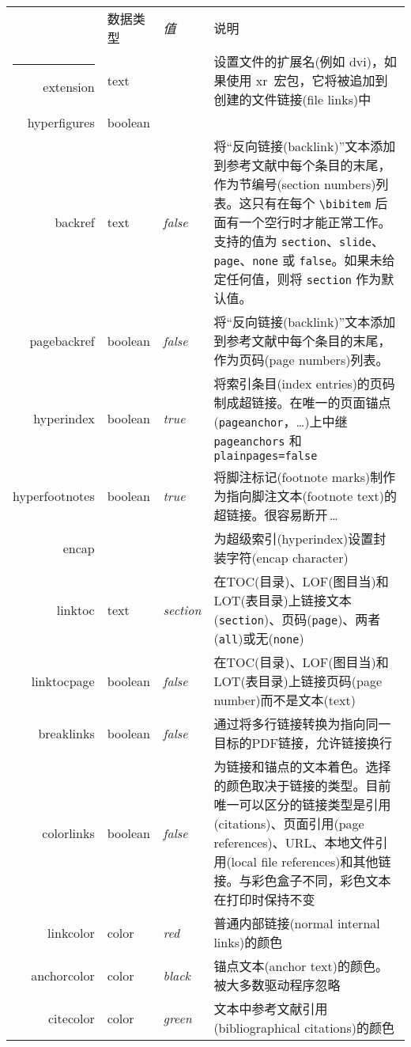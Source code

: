 \documentclass{article}
\makeatletter
\newcommand*{\xpackage}[1]{\textsf{#1}}
\newcommand{\Heiti}{\CJKfamily{Heiti}} %
\newcommand{\kaiti}{\CJKfamily{kaiti}} %
\def\hlinew#1{%
\noalign{\ifnum0=`}\fi\hrule \@height #1 \futurelet
\reserved@a\@xhline}
\makeatother
\begin{document}
\begin{longtable}{@{}>{\ttfamily}rl>{\itshape}lp{8cm}@{}}
{\Heiti 扩展选项名}&{\Heiti 数据类型}&{\Heiti 值}& {\Heiti 说明} \\ \hlinew{0.7pt}
extension      & text    &         & 设置文件的扩展名(例如 \textsf{dvi})，如果使用 \xpackage{xr}\ 宏包，它将被追加到创建的文件链接(file links)中\\
hyperfigures   & boolean &         & \\
backref        & text    & false   & 将“反向链接(backlink)”文本添加到参考文献中每个条目的末尾，作为节编号(section numbers)列表。这{\kaiti 只有}在每个 \verb|\bibitem| 后面有一个空行时才能正常工作。支持的值为 \verb|section|、\verb|slide|、\verb|page|、\verb|none| 或 \verb|false|。如果未给定任何值，则将 \verb|section| 作为默认值。\\
pagebackref    & boolean & false   & 将“反向链接(backlink)”文本添加到参考文献中每个条目的末尾，作为页码(page numbers)列表。\\
hyperindex     & boolean & true    & 将索引条目(index entries)的页码制成超链接。在唯一的页面锚点(\verb|pageanchor|，\ldots)上中继 \verb|pageanchors| 和 \verb|plainpages=false|\\
hyperfootnotes & boolean & true    & 将脚注标记(footnote marks)制作为指向脚注文本(footnote text)的超链接。很容易断开\,\ldots\\
encap          &         &         & 为超级索引(hyperindex)设置封装字符(encap character)\\
linktoc        & text    & section & 在TOC(目录)、LOF(图目当)和LOT(表目录)上链接文本(\verb|section|)、页码(\verb|page|)、两者(\verb|all|)或无(\verb|none|)\\
linktocpage    & boolean & false   & 在TOC(目录)、LOF(图目当)和LOT(表目录)上链接页码(page number)而不是文本(text)\\
breaklinks     & boolean & false   & 通过将多行链接转换为指向同一目标的PDF链接，允许链接换行\\
colorlinks     & boolean & false   & 为链接和锚点的文本着色。选择的颜色取决于链接的类型。目前唯一可以区分的链接类型是引用(citations)、页面引用(page references)、URL、本地文件引用(local file references)和其他链接。与彩色盒子不同，彩色文本在打印时保持不变\\
linkcolor      & color   & red     & 普通内部链接(normal internal links)的颜色\\
anchorcolor    & color   & black   & 锚点文本(anchor text)的颜色。被大多数驱动程序忽略\\
citecolor      & color   & green   & 文本中参考文献引用(bibliographical citations)的颜色\\

\end{longtable}
\end{document}
